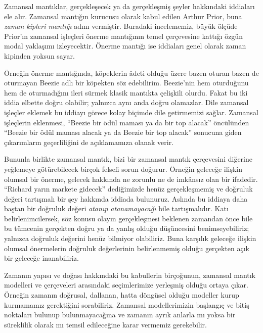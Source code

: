 \documentclass[../../../include/open-logic-section]{subfiles}
\begin{document}


Zamansal mantıklar, gerçekleşecek ya da gerçekleşmiş şeyler hakkındaki
iddiaları ele alır. Zamansal mantığın kurucusu olarak kabul edilen Arthur
Prior, buna \emph{zaman kipleri mantığı} adını vermiştir. Buradaki
incelememiz, büyük ölçüde Prior'ın zamansal işleçleri önerme mantığının temel
çerçevesine kattığı özgün modal yaklaşımı izleyecektir. Önerme mantığı ise
iddiaları genel olarak zaman kipinden yoksun sayar.

Örneğin önerme mantığında, köpeklerin âdeti olduğu üzere bazen oturan bazen
de oturmayan Beezie adlı bir köpekten söz edebilirim. Beezie'nin hem
oturduğunu hem de oturmadığını ileri sürmek klasik mantıkta çelişkili olurdu.
Fakat bu iki iddia elbette doğru olabilir; yalnızca aynı anda doğru olamazlar.
Dile zamansal işleçler eklemek bu iddiayı görece kolay biçimde dile
getirmemizi sağlar. Zamansal işleçlerin eklenmesi, ``Beezie bir ödül maması
ya da bir top alacak'' öncülünden ``Beezie bir ödül maması alacak ya da
Beezie bir top alacak'' sonucuna giden çıkarımların geçerliliğini de
açıklamamıza olanak verir.

Bununla birlikte zamansal mantık, bizi bir zamansal mantık çerçevesini
diğerine yeğlemeye götürebilecek birçok felsefi sorun doğurur. Örneğin
geleceğe ilişkin olumsal bir önerme, gelecek hakkında ne zorunlu ne de
imkânsız olan bir ifadedir. ``Richard yarın markete gidecek'' dediğimizde
henüz gerçekleşmemiş ve doğruluk değeri tartışmalı bir şey hakkında iddiada
bulunuruz. Aslında bu iddiaya daha baştan bir doğruluk değeri
\emph{atanıp atanamayacağı} bile tartışmalıdır. Katı belirlenimcilersek, söz
konusu olayın gerçekleşmesi beklenen zamandan önce bile bu tümcenin gerçekten
doğru ya da yanlış olduğu düşüncesini benimseyebiliriz; yalnızca doğruluk
değerini henüz bilmiyor olabiliriz. Buna karşılık geleceğe ilişkin olumsal
önermelerin doğruluk değerlerinin belirlenmemiş olduğu gerçekten açık bir
geleceğe inanabiliriz.

Zamanın yapısı ve doğası hakkındaki bu kabullerin birçoğunun, zamansal mantık
modelleri ve çerçeveleri arasındaki seçimlerimize yerleşmiş olduğu ortaya
çıkar. Örneğin zamanın doğrusal, dallanan, hatta döngüsel olduğu modeller
kurup kurmamamız gerektiğini sorabiliriz. Zamansal modellerimizin başlangıç
ve bitiş noktaları bulunup bulunmayacağına ve zamanın ayrık anlarla mı yoksa
bir süreklilik olarak mı temsil edileceğine karar vermemiz gerekebilir.
\end{document}
